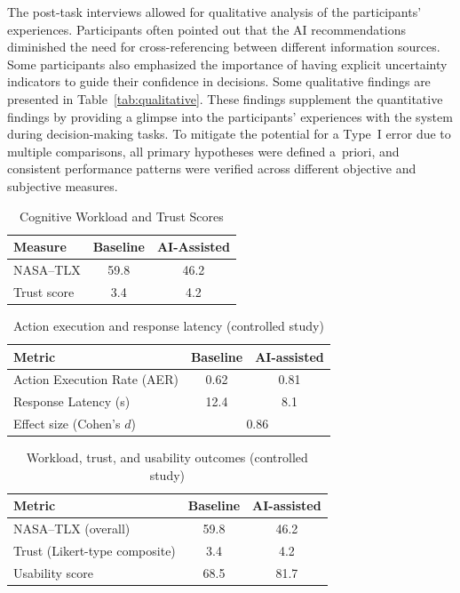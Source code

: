 \documentclass[journal]{IEEEtran}
\theoremstyle{plain}
\theoremstyle{definition}
\begin{document}
    The post-task interviews allowed for qualitative analysis of the participants' experiences. Participants often pointed out that the AI recommendations diminished the need for cross-referencing between different information sources. Some participants also emphasized the importance of having explicit uncertainty indicators to guide their confidence in decisions.
    Some qualitative findings are presented in Table~\ref{tab:qualitative}. These findings supplement the quantitative findings by providing a glimpse into the participants' experiences with the system during decision-making tasks.
    To mitigate the potential for a Type~I error due to multiple comparisons, all primary hypotheses were defined a~priori, and consistent performance patterns were verified across different objective and subjective measures.


    \begin{table}[t]
        \caption{Cognitive Workload and Trust Scores}
        \label{tab:workload_trust}
        \centering
        \begin{tabular}{l c c}
            \hline
            Measure & Baseline & AI-Assisted \\
            \hline
            NASA--TLX & 59.8 & 46.2 \\
            Trust score & 3.4 & 4.2 \\
            \hline
        \end{tabular}
    \end{table}

    \begin{table}[t]
        \caption{Action execution and response latency (controlled study)}
        \label{tab:action_latency}
        \centering
        \begin{tabular}{lcc}
            \toprule
            \textbf{Metric} & \textbf{Baseline} & \textbf{AI-assisted} \\
            \midrule
            Action Execution Rate (AER) & 0.62 & 0.81 \\
            Response Latency (s) & 12.4 & 8.1 \\
            Effect size (Cohen's $d$) & \multicolumn{2}{c}{0.86} \\
            \bottomrule
        \end{tabular}
    \end{table}

    \begin{table}[t]
        \caption{Workload, trust, and usability outcomes (controlled study)}
        \label{tab:workload_trust}
        \centering
        \begin{tabular}{lcc}
            \toprule
            \textbf{Metric} & \textbf{Baseline} & \textbf{AI-assisted} \\
            \midrule
            NASA--TLX (overall) & 59.8 & 46.2 \\
            Trust (Likert-type composite) & 3.4 & 4.2 \\
            Usability score & 68.5 & 81.7 \\
            \bottomrule
        \end{tabular}
    \end{table}
\end{document}
